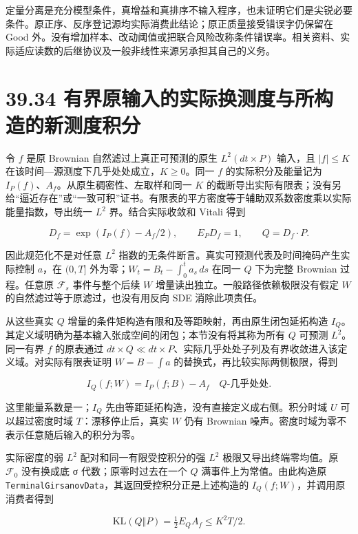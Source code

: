 \documentclass[
  11pt,
  oneside]{book}
\begin{document}
定量分离是充分模型条件，真增益和真排序不输入程序，也未证明它们是尖锐必要条件。原正序、反序登记源均实际消费此结论；原正质量接受错误字仍保留在 Good 外。没有增加样本、改动阈值或把联合风险改称条件错误率。相关资料、实际适应读数的后继协议及一般非线性来源另承担其自己的义务。

\section{39.34 有界原输入的实际换测度与所构造的新测度积分}\label{ux6709ux754cux539fux8f93ux5165ux7684ux5b9eux9645ux6362ux6d4bux5ea6ux4e0eux6240ux6784ux9020ux7684ux65b0ux6d4bux5ea6ux79efux5206}

令 \(f\) 是原 Brownian 自然滤过上真正可预测的原生 \(L^2(dt\times P)\) 输入，且 \(|f|\le K\) 在该时间---源测度下几乎处处成立，\(K\ge0\)。同一 \(f\) 的实际积分及能量记为 \(I_P(f)\)、\(A_f\)。从原生稠密性、左取样和同一 \(K\) 的截断导出实际有限表；没有另给``逼近存在''或``一致可积''证书。有限表的平方密度等于辅助双系数密度乘以实际能量指数，导出统一 \(L^2\) 界。结合实际收敛和 Vitali 得到

\[D_f=\exp(I_P(f)-A_f/2),\qquad E_P D_f=1,\qquad Q=D_f\cdot P.\]

因此规范化不是对任意 \(L^2\) 指数的无条件断言。真实可预测代表及时间掩码产生实际控制 \(a\)，在 \((0,T]\) 外为零；\(W_t=B_t-\int_0^t a_s\,ds\) 在同一 \(Q\) 下为完整 Brownian 过程。任意原 \(\mathcal F_s\) 事件与整个后续 \(W\) 增量读出独立。一般路径依赖极限没有假定 \(W\) 的自然滤过等于原滤过，也没有用反向 SDE 消除此项责任。

从这些真实 \(Q\) 增量的条件矩构造有限和及等距映射，再由原生闭包延拓构造 \(I_Q\)。其定义域明确为基本输入张成空间的闭包；本节没有将其称为所有 \(Q\) 可预测 \(L^2\)。同一有界 \(f\) 的原表通过 \(dt\times Q\ll dt\times P\)、实际几乎处处子列及有界收敛进入该定义域。对实际有限表证明 \(W=B-\int a\) 的替换式，再比较实际两侧极限，得到

\[I_Q(f;W)=I_P(f;B)-A_f\quad Q\text{-几乎处处}.\]

这里能量系数是一；\(I_Q\) 先由等距延拓构造，没有直接定义成右侧。积分时域 \(U\) 可以超过密度时域 \(T\)：漂移停止后，真实 \(W\) 仍有 Brownian 噪声。密度时域为零不表示任意随后输入的积分为零。

实际密度的弱 \(L^2\) 配对和同一有限受控积分的强 \(L^2\) 极限又导出终端零均值。原 \(\mathcal F_0\) 没有换成底 σ 代数；原零时过去在一个 \(Q\) 满事件上为常值。由此构造原 \nolinkurl{TerminalGirsanovData}，其返回受控积分正是上述构造的 \(I_Q(f;W)\)，并调用原消费者得到

\[\mathrm{KL}(Q\Vert P)=\tfrac12 E_Q A_f\le K^2T/2.\]
\end{document}
